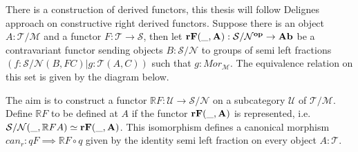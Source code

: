         \begin{center}
        \end{center}

        There is a construction of derived functors, this thesis will follow Delignes approach on constructive right derived functors. Suppose there is an object $A:\mathcal{T}/\mathcal{M}$ and a functor $F:\mathcal{T}\rightarrow\mathcal{S}$, then let $\bf{r} F(\_,A):\mathcal{S}/\mathcal{N}^{op}\rightarrow Ab$ be a contravariant functor sending objects $B:\mathcal{S}/\mathcal{N}$ to groups of semi left fractions $(f:\mathcal{S}/\mathcal{N}(B,FC)|g:\mathcal{T}(A,C))$ such that $g:Mor_{\mathcal{M}}$. The equivalence relation on this set is given by the diagram below.

        \begin{center}
        \end{center}
        
        The aim is to construct a functor $\mathbb{R}F:\mathcal{U}\rightarrow \mathcal{S}/\mathcal{N}$ on a subcategory $\mathcal{U}$ of $\mathcal{T}/\mathcal{M}$. Define $\mathbb{R}F$ to be defined at $A$ if the functor $\bf{r} F(\_,A)$ is represented, i.e. $\mathcal{S}/\mathcal{N}(\_,\mathbb{R}FA)\simeq\bf{r} F(\_,A)$. This isomorphism defines a canonical morphism $can_r:qF\implies \mathbb{R}F\circ q$ given by the identity semi left fraction on every object $A:\mathcal{T}$.
        
